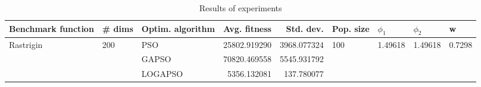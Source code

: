 \begin{table}
\centering
\caption{Results of experiments}
\begin{tabular}{lllrrllll}
\toprule
        Benchmark function &              \# dims & Optim. algorithm &  Avg. fitness &   Std. dev. &            Pop. size &               $\phi_{1}$ &               $\phi_{2}$ &                       w \\
\midrule
\multirow{3}{*}{Rastrigin} & \multirow{3}{*}{200} &              PSO &  25802.919290 & 3968.077324 & \multirow{3}{*}{100} & \multirow{3}{*}{1.49618} & \multirow{3}{*}{1.49618} & \multirow{3}{*}{0.7298} \\
                           &                      &            GAPSO &  70820.469558 & 5545.931792 &                      &                          &                          &                         \\
                           &                      &          LOGAPSO &   5356.132081 &  137.780077 &                      &                          &                          &                         \\
\bottomrule
\end{tabular}
\end{table}
